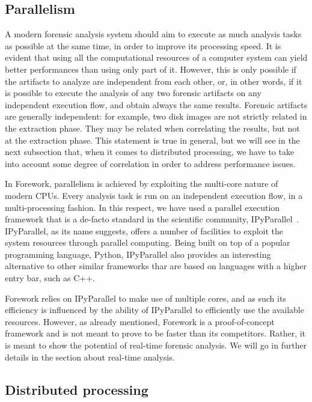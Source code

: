 \documentclass[twoside]{article}
\begin{document}
\begin{multicols}{2}
\subsection*{Parallelism}
A modern forensic analysis system should aim to execute as much analysis tasks
as possible at the same time, in order to improve its processing speed. It is
evident that using all the computational resources of a computer system can
yield better performances than using only part of it.
However, this is only possible if the artifacts to analyze are independent from
each other, or, in other words, if it is possible to execute the analysis of any
two forensic artifacts on any independent execution flow, and obtain always the
same results.
Forensic artifacts are generally independent: for example, two disk images are
not strictly related in the extraction phase. They may be related when
correlating the results, but not at the extraction phase.
This statement is true in general, but we will see in the next subsection that,
when it comes to distributed processing, we have to take into account some degree
of correlation in order to address performance issues.

In Forework, parallelism is achieved by exploiting the multi-core nature of
modern CPUs. Every analysis task is run on an independent execution flow, in a
multi-processing fashion. In this respect, we have used a parallel execution
framework that is a de-facto standard in the scientific community,
IPyParallel~\cite{ipyparallel}. IPyParallel, as its name suggests, offers a
number of facilities to exploit the system resources through parallel computing.
Being built on top of a popular programming language, Python, IPyParallel also
provides an interesting alternative to other similar frameworks thar are based
on languages with a higher entry bar, such as C++.

Forework relies on IPyParallel to make use of multiple cores, and as such its
efficiency is influenced by the ability of IPyParallel to efficiently use the
available resources. However, as already mentioned, Forework is a
proof-of-concept framework and is not meant to prove to be faster than its
competitors. Rather, it is meant to show the potential of real-time
forensic analysis. We will go in further details in the section about real-time
analysis.

\subsection*{Distributed processing}


\end{multicols}
\end{document}
